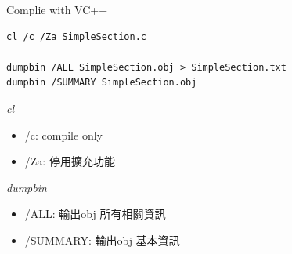 \begin{frame}[fragile]{Complie with VC++}
        \begin{lstlisting}
cl /c /Za SimpleSection.c

dumpbin /ALL SimpleSection.obj > SimpleSection.txt
dumpbin /SUMMARY SimpleSection.obj
        \end{lstlisting}
        \begin{block}{\emph{cl}}
        \begin{itemize}
            \item /c: compile only
            \item /Za:  停用擴充功能
        \end{itemize}
        \end{block}
        \begin{block}{\emph{dumpbin}}
        \begin{itemize}
            \item /ALL: 輸出obj 所有相關資訊
            \item /SUMMARY: 輸出obj 基本資訊
        \end{itemize}
        \end{block}
\end{frame}


